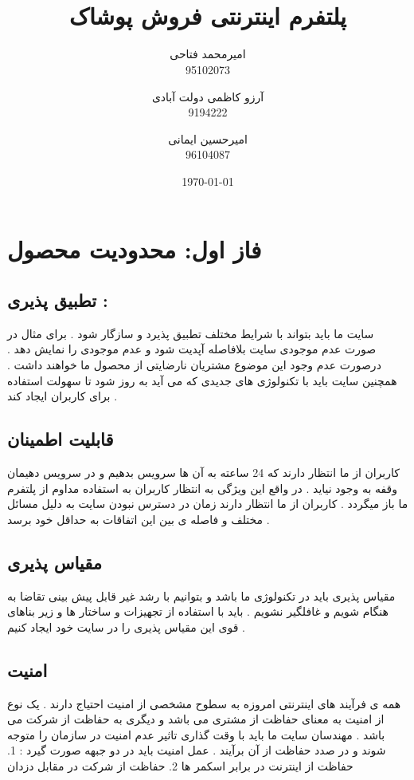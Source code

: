 \documentclass[12pt,onecolumn,a4paper]{article}
\begin{document}
\title{ \\ پلتفرم اینترنتی فروش پوشاک}
\author{امیرمحمد فتاحی\\95102073 \and آرزو کاظمی دولت آبادی \\9194222 \and امیرحسین ایمانی\\96104087}
\date{\today}
\maketitle

\newpage
\tableofcontents
\newpage
\listoffigures
\newpage


\section{فاز اول: محدودیت محصول}
\subsection{تطبیق پذیری :}

سایت ما باید بتواند با شرایط مختلف تطبیق پذیرد و سازگار شود . برای مثال در صورت عدم موجودی سایت بلافاصله آپدیت شود و عدم موجودی را نمایش دهد . درصورت عدم وجود این موضوع مشتریان نارضایتی از محصول ما خواهند داشت . همچنین سایت باید با تکنولوژی های جدیدی که می آید به روز شود تا سهولت استفاده برای کاربران ایجاد کند .
\subsection{قابلیت اطمینان }
کاربران از ما انتظار دارند که 24 ساعته به آن ها سرویس بدهیم و در سرویس دهیمان وقفه به وجود نیاید . در واقع این ویژگی به انتظار کاربران به استفاده مداوم از پلتفرم ما باز میگردد . کاربران از ما انتظار دارند زمان در دسترس نبودن سایت به دلیل مسائل مختلف و فاصله ی بین این اتفاقات به حداقل خود برسد .

\subsection{مقیاس پذیری }
مقیاس پذیری باید در تکنولوژی ما باشد و بتوانیم با رشد غیر قابل پیش بینی تقاضا به هنگام شویم و غافلگیر نشویم . باید با استفاده از تجهیزات و ساختار ها و زیر بناهای قوی این مقیاس پذیری را در سایت خود ایجاد کنیم .

\subsection{امنیت}
همه ی فرآیند های اینترنتی امروزه به سطوح مشخصی از امنیت احتیاج دارند . یک نوع از امنیت به معنای حفاظت از مشتری می باشد و دیگری به حفاظت از شرکت می باشد . مهندسان سایت ما باید با وقت گذاری تاثیر عدم امنیت در سازمان را متوجه شوند و در صدد حفاظت از آن برآیند .  عمل امنیت باید در دو جبهه صورت گیرد : 1. حفاظت از اینترنت در برابر اسکمر ها 2. حفاظت از شرکت در مقابل دزدان
\end{document}
